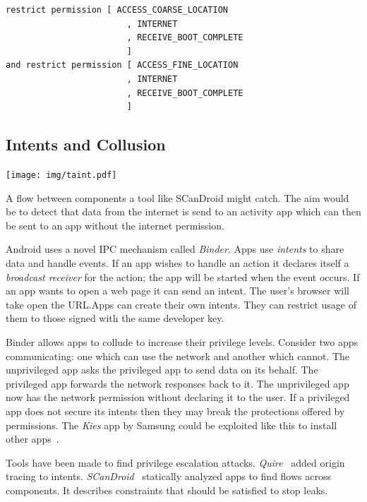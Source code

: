 \documentclass[a4paper]{article}
\begin{document}
\begin{lstlisting}[language=Kirin]
    restrict permission [ ACCESS_COARSE_LOCATION
                        , INTERNET
                        , RECEIVE_BOOT_COMPLETE
                        ]
and restrict permission [ ACCESS_FINE_LOCATION
                        , INTERNET
                        , RECEIVE_BOOT_COMPLETE
                        ]
\end{lstlisting}

\subsection{Intents and Collusion}\label{sec:intents}

\begin{marginfigure}
  \centering
  \texttt{[image: img/taint.pdf]}
  \caption{A flow between components a tool like SCanDroid might
  catch. The aim would be to detect that data from the internet is send to an
activity app which can then be sent to an app without the internet permission.}
  \label{fig:taint}
\end{marginfigure}

Android uses a novel IPC mechanism called \emph{Binder}. Apps use \emph{intents}
to share data and handle events. If an app wishes to handle an
 action it declares itself a \emph{broadcast receiver} for
the action; the app will be started when the event occurs.  If an app wants to
open a web page it can send an  intent. The user's browser
will take open the URL.\@ Apps can create their own intents. They can restrict
usage of them to those signed with the same developer key.

Binder allows apps to collude to increase their privilege levels.  Consider two
apps communicating: one which can use the network and another which cannot.  The
unprivileged app asks the privileged app to send data on its behalf. The
privileged app forwards the network responses back to it. The unprivileged app
now has the network permission without declaring it to the user.  If a
privileged app does not secure its intents then they may break the protections
offered by permissions. The \emph{Kies} app by Samsung could be exploited like
this to install other apps~\cite{moulu:8btkPowj}.

Tools have been made to find privilege escalation attacks.
\emph{Quire}~\cite{Bugiel:2012ui} added origin tracing to intents.
\emph{SCanDroid}~\cite{Fuchs:2009vi} statically analyzed apps to find flows
across components. It describes constraints that should be satisfied to stop
leaks. 
\end{document}
